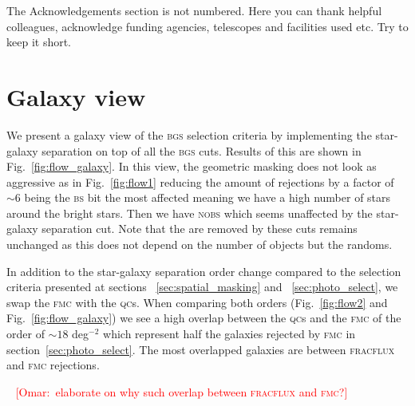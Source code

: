 \documentclass[fleqn,usenatbib]{mnras}
\newcommand{\omar}[1]{~\newline\noindent \textcolor{red}{{ [Omar:~{#1}]\\}}}
\newcommand{\BGS}{\textsc{bgs}\xspace}
\newcommand{\BS}{\textsc{bs}\xspace}
\newcommand{\FMC}{{\textsc{fmc}}\xspace}
\newcommand{\FRACFLUX}{{\textsc{fracflux}}\xspace}
\newcommand{\NOBS}{\textsc{nobs}\xspace}
\newcommand{\QCs}{\textsc{qc}s\xspace}
\begin{document}
The Acknowledgements section is not numbered. Here you can thank helpful
colleagues, acknowledge funding agencies, telescopes and facilities used etc.
Try to keep it short.









\appendix
\section{Galaxy view}\label{app:galview}

We present a galaxy view of the \BGS selection criteria by implementing the star-galaxy separation on top of all the \BGS cuts. Results of this are shown in Fig.~\ref{fig:flow_galaxy}. In this view, the geometric masking does not look as aggressive as in Fig.~\ref{fig:flow1} reducing the amount of rejections by a factor of $\sim 6$ being the \BS bit the most affected meaning we have a high number of stars around the bright stars. Then we have \NOBS which seems unaffected by the star-galaxy separation cut. Note that the are removed by these cuts remains unchanged as this does not depend on the number of objects but the randoms.  

In addition to the star-galaxy separation order change compared to the selection criteria presented at sections ~\ref{sec:spatial_masking} and ~\ref{sec:photo_select}, we swap the \FMC with the \QCs. When comparing both orders (Fig.~\ref{fig:flow2} and Fig.~\ref{fig:flow_galaxy}) we see a high overlap between the \QCs and the \FMC of the order of $\sim 18$ deg$^{-2}$ which represent half the galaxies rejected by \FMC in section~\ref{sec:photo_select}. The most overlapped galaxies are between \FRACFLUX and \FMC rejections. 

\omar{elaborate on why such overlap between \FRACFLUX and \FMC ?}
\end{document}
